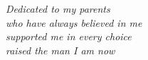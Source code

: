 
\cleardoublepage
{}
\thispagestyle{empty}

\vspace*{3cm}


\medskip
\vspace*{\fill}
\begin{flushright}
    \emph{Dedicated to my parents}\\
    \emph{who have always believed in me}\\
    \emph{supported me in every choice}\\
    \emph{raised the man I am now}\\
\end{flushright}
\vspace*{\fill}
